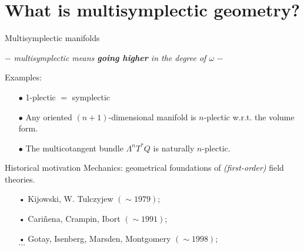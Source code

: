 \documentclass[10pt]{beamer}
\begin{document}
\section{What is \textbf{multisymplectic geometry}?}
\checkpoint	


\begin{frame}[t, fragile]{Multisymplectic manifolds} %
	\begin{center}
		$-$ \emph{multisymplectic means \textbf{going higher} in the degree of $\omega$} $-$
	\end{center}
	\pause
	\begin{defblock}
			
	\end{defblock}
	\vfill
	\pause
	\begin{block}{Examples:}
		\begin{itemize}
			\item[$\bullet$] 1-plectic $=$ symplectic
			\item[$\bullet$] Any oriented $(n+1)$-dimensional manifold is $n$-plectic w.r.t. the volume form.
			\item[$\bullet$] The multicotangent bundle $\Lambda^n T^\ast Q$ is naturally $n$-plectic.
		\end{itemize}
	\end{block}			 
%
	\pause
	\begin{block}{Historical motivation}
		Mechanics: geometrical foundations of \textit{(first-order)} field theories.
		\begin{itemize}
		 \item[•] Kijowski, W. Tulczyjew $(\sim 1979 )$;
		 \item[•] Cariñena, Crampin, Ibort $(\sim 1991 )$;
		 \item[•] Gotay, Isenberg, Marsden, Montgomery $(\sim 1998 )$;
		 \\ $\cdots$
		\end{itemize}
	\end{block}
\end{frame}


\end{document}
